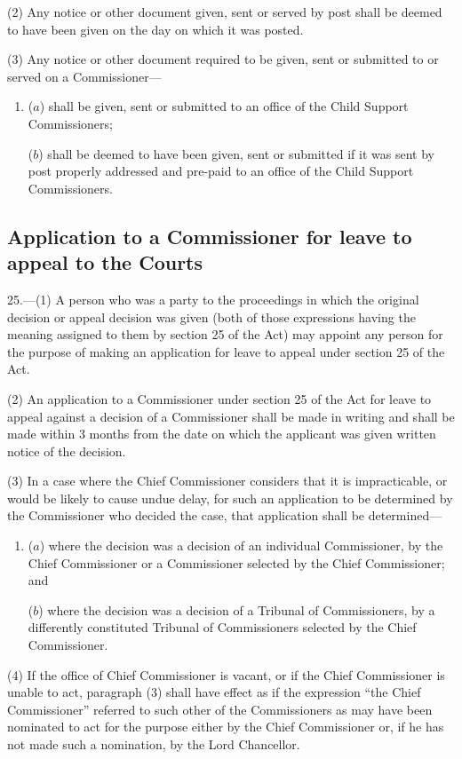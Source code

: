\documentclass[a4paper]{article}
\begin{document}
(2) Any notice or other document given, sent or served by post shall be deemed to have been given on the day on which it was posted.

(3) Any notice or other document required to be given, sent or submitted to or served on a Commissioner—
\begin{enumerate}\item[]
($a$) shall be given, sent or submitted to an office of the Child Support Commissioners;

($b$) shall be deemed to have been given, sent or submitted if it was sent by post properly addressed and pre-paid to an office of the Child Support Commissioners.
\end{enumerate}

\subsection[25. Application to a Commissioner for leave to appeal to the Courts]{Application to a Commissioner for leave to appeal to the Courts}

25.—(1) A person who was a party to the proceedings in which the original decision or appeal decision was given (both of those expressions having the meaning assigned to them by section 25 of the Act) may appoint any person for the purpose of making an application for leave to appeal under section 25 of the Act.

(2) An application to a Commissioner under section 25 of the Act for leave to appeal against a decision of a Commissioner shall be made in writing and shall be made within 3 months from the date on which the applicant was given written notice of the decision.

(3) In a case where the Chief Commissioner considers that it is impracticable, or would be likely to cause undue delay, for such an application to be determined by the Commissioner who decided the case, that application shall be determined—
\begin{enumerate}\item[]
($a$) where the decision was a decision of an individual Commissioner, by the Chief Commissioner or a Commissioner selected by the Chief Commissioner; and

($b$) where the decision was a decision of a Tribunal of Commissioners, by a differently constituted Tribunal of Commissioners selected by the Chief Commissioner.
\end{enumerate}

(4) If the office of Chief Commissioner is vacant, or if the Chief Commissioner is unable to act, paragraph (3) shall have effect as if the expression “the Chief Commissioner” referred to such other of the Commissioners as may have been nominated to act for the purpose either by the Chief Commissioner or, if he has not made such a nomination, by the Lord Chancellor.
\end{document}
